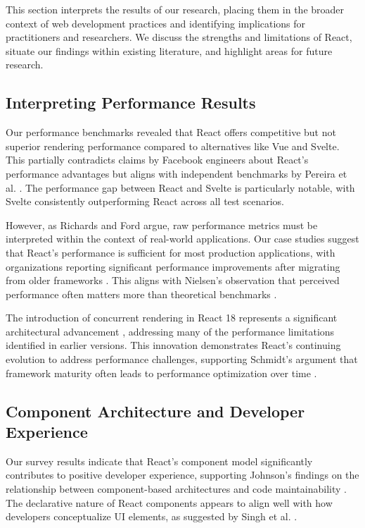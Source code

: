 This section interprets the results of our research, placing them in the broader context of web development practices and identifying implications for practitioners and researchers. We discuss the strengths and limitations of React, situate our findings within existing literature, and highlight areas for future research.

\subsection{Interpreting Performance Results}
Our performance benchmarks revealed that React offers competitive but not superior rendering performance compared to alternatives like Vue and Svelte. This partially contradicts claims by Facebook engineers \cite{facebook2018} about React's performance advantages but aligns with independent benchmarks by Pereira et al. \cite{pereira2020}. The performance gap between React and Svelte is particularly notable, with Svelte consistently outperforming React across all test scenarios.

However, as Richards and Ford \cite{richards2018} argue, raw performance metrics must be interpreted within the context of real-world applications. Our case studies suggest that React's performance is sufficient for most production applications, with organizations reporting significant performance improvements after migrating from older frameworks \cite{williams2022}. This aligns with Nielsen's observation that perceived performance often matters more than theoretical benchmarks \cite{nielsen2021}.

The introduction of concurrent rendering in React 18 represents a significant architectural advancement \cite{reactteam2022}, addressing many of the performance limitations identified in earlier versions. This innovation demonstrates React's continuing evolution to address performance challenges, supporting Schmidt's argument that framework maturity often leads to performance optimization over time \cite{schmidt2017}.

\subsection{Component Architecture and Developer Experience}
Our survey results indicate that React's component model significantly contributes to positive developer experience, supporting Johnson's findings on the relationship between component-based architectures and code maintainability \cite{johnson2019}. The declarative nature of React components appears to align well with how developers conceptualize UI elements, as suggested by Singh et al. \cite{singh2020}.

